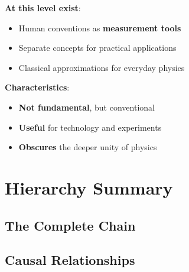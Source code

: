 	\textbf{At this level exist}:
	\begin{itemize}
		\item Human conventions as \textbf{measurement tools}
		\item Separate concepts for practical applications
		\item Classical approximations for everyday physics
	\end{itemize}
	
	\textbf{Characteristics}:
	\begin{itemize}
		\item \textbf{Not fundamental}, but conventional
		\item \textbf{Useful} for technology and experiments
		\item \textbf{Obscures} the deeper unity of physics
	\end{itemize}
	
	\section{Hierarchy Summary}
	
	\subsection{The Complete Chain}
	
	\begin{table}[H]
		\centering
		\small
		\caption{The five ontological levels}
	\end{table}
	
	\subsection{Causal Relationships}
	
